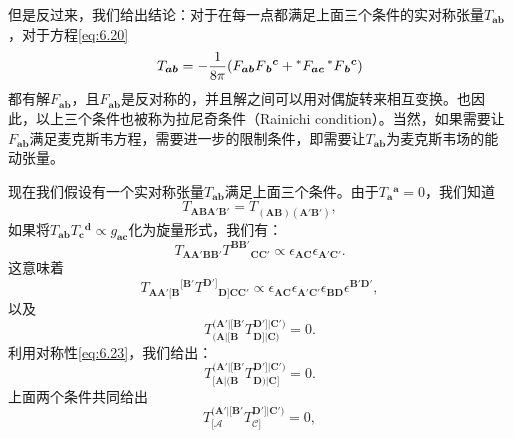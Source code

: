 但是反过来，我们给出结论：对于在每一点都满足上面三个条件的实对称张量$T_{\boldsymbol{ab}}$，对于方程\ref{eq:6.20}
\begin{equation}
	T_{\boldsymbol{ab}} =-\frac{1}{8\pi } (F_{\boldsymbol{ab}} F{_{\boldsymbol{b}}}^{\boldsymbol{c}} +\prescript{*}{}{} F_{\boldsymbol{ac}}\prescript{*}{}{} F{_{\boldsymbol{b}}}^{\boldsymbol{c}} )
	\label{eq:6.22}
\end{equation}
都有解$F_{\boldsymbol{ab}}$，且$F_{\boldsymbol{ab}}$是反对称的，并且解之间可以用对偶旋转来相互变换。也因此，以上三个条件也被称为拉尼奇条件（Rainichi condition）。当然，如果需要让$F_{\boldsymbol{ab}}$满足麦克斯韦方程，需要进一步的限制条件，即需要让$T_{\boldsymbol{ab}}$为麦克斯韦场的能动张量。

现在我们假设有一个实对称张量$T_{\boldsymbol{ab}}$满足上面三个条件。由于$T{_{\boldsymbol{a}}}^{\boldsymbol{a}} =0$，我们知道
\begin{equation}
	T_{\boldsymbol{ABA} '\boldsymbol{B} '} =T_{(\boldsymbol{AB})(\boldsymbol{A} '\boldsymbol{B} ')} ,
	\label{eq:6.23}
\end{equation}
如果将$T_{\boldsymbol{ab}} T{_{\boldsymbol{c}}}^{\boldsymbol{d}} \propto g_{\boldsymbol{ac}}$化为旋量形式，我们有：
\begin{equation*}
	T_{\boldsymbol{AA} '\boldsymbol{BB} '} T^{\boldsymbol{BB} '}{}_{\boldsymbol{CC} '} \propto \epsilon _{\boldsymbol{AC}} \epsilon _{\boldsymbol{A} '\boldsymbol{C} '} .
\end{equation*}
这意味着
\begin{equation*}
	T{_{\boldsymbol{AA} '[\boldsymbol{B}}}^{[\boldsymbol{B} '} T^{\boldsymbol{D} ']}{}_{\boldsymbol{D}]\boldsymbol{CC} '} \propto \epsilon _{\boldsymbol{AC}} \epsilon _{\boldsymbol{A} '\boldsymbol{C} '} \epsilon _{\boldsymbol{BD}} \epsilon ^{\boldsymbol{B} '\boldsymbol{D} '} ,
\end{equation*}
以及
\begin{equation*}
	T_{(\boldsymbol{A} |[\boldsymbol{B}}^{(\boldsymbol{A} '|[\boldsymbol{B} '} T_{\boldsymbol{D}] |\boldsymbol{C})}^{\boldsymbol{D} '] |\boldsymbol{C} ')} =0.
\end{equation*}
利用对称性\ref{eq:6.23}，我们给出：
\begin{equation*}
	T_{[\boldsymbol{A} |(\boldsymbol{B}}^{(\boldsymbol{A} '|[\boldsymbol{B} '} T_{\boldsymbol{D}) |\boldsymbol{C}]}^{\boldsymbol{D} '] |\boldsymbol{C} ')} =0.
\end{equation*}
上面两个条件共同给出
\begin{equation*}
	T_{[\mathcal{A}}^{(\boldsymbol{A} '|[\boldsymbol{B} '} T_{\mathcal{C}]}^{\boldsymbol{D} '] |\boldsymbol{C} ')} =0,
\end{equation*}
